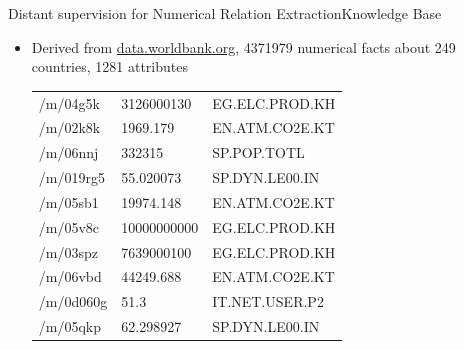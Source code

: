 \documentclass{beamer}
\begin{document}
\begin{frame}{Distant supervision for Numerical Relation Extraction}{Knowledge Base}
 \begin{itemize}
  \item Derived from \url{data.worldbank.org}, 4371979 numerical facts about 249 countries, 1281 attributes 

\begin{tabular}{|l|l|l|}
\hline
/m/04g5k&3126000130&EG.ELC.PROD.KH\\
/m/02k8k&1969.179&EN.ATM.CO2E.KT\\
/m/06nnj&332315&SP.POP.TOTL\\
/m/019rg5&55.020073&SP.DYN.LE00.IN\\
/m/05sb1&19974.148&EN.ATM.CO2E.KT\\
/m/05v8c&10000000000&EG.ELC.PROD.KH\\
/m/03spz&7639000100&EG.ELC.PROD.KH\\
/m/06vbd&44249.688&EN.ATM.CO2E.KT\\
/m/0d060g&51.3&IT.NET.USER.P2\\
/m/05qkp&62.298927&SP.DYN.LE00.IN\\
\hline
\end{tabular}


\end{itemize}

\end{frame}
\end{document}
